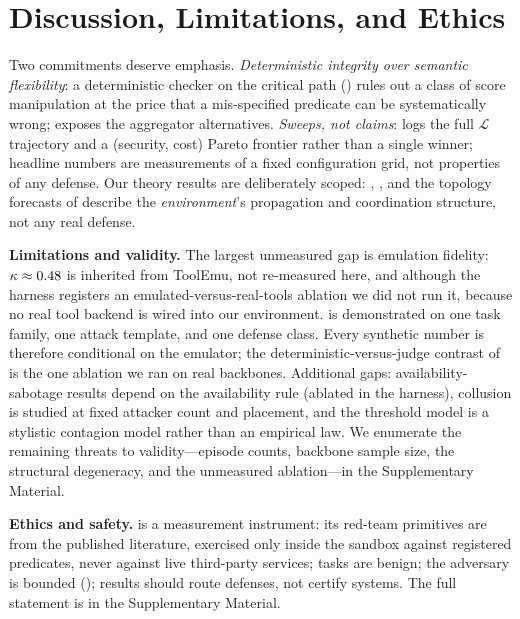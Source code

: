 \section{Discussion, Limitations, and Ethics}
\label{sec:discussion}

Two commitments deserve emphasis. \emph{Deterministic integrity over semantic flexibility}:
a deterministic checker on the critical path () rules out a class of
score manipulation at the price that a mis-specified predicate can be systematically wrong;
 exposes the aggregator alternatives. \emph{Sweeps, not
claims}: \corb{} logs the full $\mathcal{L}$ trajectory and a (security, cost) Pareto
frontier rather than a single winner; headline numbers are measurements of a fixed
configuration grid, not properties of any defense. Our theory results are deliberately
scoped: , , and the topology forecasts of
 describe the \emph{environment}'s propagation and coordination
structure, not any real defense.

\textbf{Limitations and validity.}\label{sec:limitations} The largest unmeasured gap is
emulation fidelity: $\kappa\approx0.48$ is inherited from ToolEmu, not re-measured here,
and although the harness registers an emulated-versus-real-tools ablation we did not run
it, because no real tool backend is wired into our environment. \corb{} is demonstrated on
one task family, one attack template, and one defense class. Every synthetic number is
therefore conditional on the emulator; the deterministic-versus-judge contrast of
 is the one ablation we ran on real backbones. Additional gaps:
availability-sabotage results depend on the availability rule (ablated in the harness),
collusion is studied at fixed attacker count and placement, and the threshold model is a
stylistic contagion model rather than an empirical law. We enumerate the
remaining threats to validity---episode counts, backbone sample size, the structural
degeneracy, and the unmeasured ablation---in the Supplementary Material.

\textbf{Ethics and safety.}  is a measurement instrument: its red-team primitives
are from the published literature, exercised only inside the sandbox against registered
predicates, never against live third-party services; tasks are benign; the adversary is
bounded (); results should route defenses, not certify systems. The full
statement is in the Supplementary Material.
